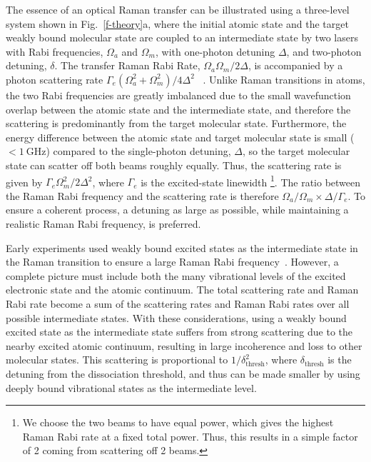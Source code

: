 \documentclass[aps,prl,twocolumn,10pt,superscriptaddress]{revtex4-1}
\begin{document}
The essence of an optical Raman transfer can be illustrated
using a three-level system shown in Fig.~\ref{f-theory}a,
where the initial atomic state and the target weakly bound molecular state are coupled to an intermediate state by two lasers with Rabi frequencies, $\Omega_a$ and $\Omega_m$, with one-photon detuning $ \Delta $, and two-photon detuning, $ \delta$.  %
The transfer Raman Rabi Rate, $\Omega_a\Omega_m / 2\Delta$, is accompanied by a photon scattering rate $\Gamma_e (\Omega_a^2 + \Omega_m^2)/4\Delta^2$
~\cite{Wineland2003}.
Unlike Raman transitions in atoms, the two Rabi frequencies are greatly imbalanced %
due to the small wavefunction overlap between the atomic state and the intermediate state, %
and therefore the scattering is predominantly from the target molecular state. Furthermore, the energy difference between the atomic state and target molecular state is small ($ < 1~\mathrm{GHz} $) compared to the single-photon detuning, $ \Delta $, so the target molecular state can scatter off both beams roughly equally. Thus, the scattering rate is given by $ \Gamma_e \Omega_m^2 / 2\Delta^2$, where $ \Gamma_e $ is the excited-state linewidth \footnote{We choose the two beams to have equal power, which gives the highest Raman Rabi rate at a fixed total power. Thus, this results in a simple factor of 2 coming from scattering off 2 beams.}.
The ratio between the Raman Rabi frequency and the scattering rate is therefore $ \Omega_a/\Omega_m \times \Delta/\Gamma_e $. %
To ensure a coherent process, a detuning as large as possible, while maintaining a realistic Raman Rabi frequency, is preferred. %

Early experiments used weakly bound excited states as the intermediate state
in the Raman transition to ensure a large Raman Rabi frequency~\cite{Wynar2000,Rom2004}.
However, a complete picture must include both the many vibrational levels
of the excited electronic state and the atomic continuum.
The total scattering rate and Raman Rabi rate become a sum of the scattering rates
and Raman Rabi rates over all possible intermediate states.
With these considerations, using a weakly bound excited state as the intermediate state
suffers from strong scattering due to the nearby excited atomic continuum,
resulting in large incoherence and loss to other molecular states.
This scattering is proportional to $1/\delta_{\mathrm{thresh}}^2$,
where $\delta_{\mathrm{thresh}}$ is the detuning from the dissociation threshold,
and thus can be made smaller by using deeply bound vibrational states as the intermediate level.
\end{document}
